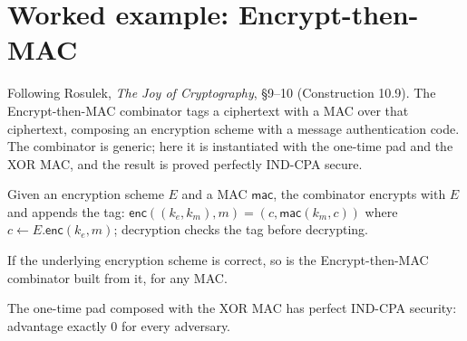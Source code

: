 \chapter{Worked example: Encrypt-then-MAC}

Following Rosulek, \emph{The Joy of Cryptography}, §9--10 (Construction 10.9). The
Encrypt-then-MAC combinator tags a ciphertext with a MAC over that ciphertext,
composing an encryption scheme with a message authentication code. The combinator
is generic; here it is instantiated with the one-time pad and the XOR MAC, and the
result is proved perfectly IND-CPA secure.

\begin{definition}
  \label{def:etm}
  \leanok
  Given an encryption scheme $E$ and a MAC $\mathsf{mac}$, the combinator encrypts
  with $E$ and appends the tag: $\mathsf{enc}((k_e, k_m), m) = (c,
  \mathsf{mac}(k_m, c))$ where $c \leftarrow E.\mathsf{enc}(k_e, m)$; decryption
  checks the tag before decrypting.
\end{definition}

\begin{theorem}
  \label{thm:etm-correct}
  \leanok
  If the underlying encryption scheme is correct, so is the Encrypt-then-MAC
  combinator built from it, for any MAC.
\end{theorem}

\begin{theorem}
  \label{thm:etm-perfect}
  \leanok
  The one-time pad composed with the XOR MAC has perfect IND-CPA security:
  advantage exactly $0$ for every adversary.
\end{theorem}
